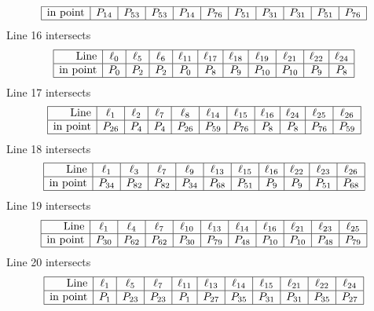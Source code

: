 \documentclass{article}
\begin{document}
{$$\begin{array}{|r*{10}{|c}|}
\hline
\mbox{in point}  & P_{14} & P_{53} & P_{53} & P_{14} & P_{76} & P_{51} & P_{31} & P_{31} & P_{51} & P_{76}\\
\hline
\end{array}
$$
Line 16 intersects 
$$
\begin{array}{|r*{10}{|c}|}
\hline
\mbox{Line}  & \ell_{0} & \ell_{5} & \ell_{6} & \ell_{11} & \ell_{17} & \ell_{18} & \ell_{19} & \ell_{21} & \ell_{22} & \ell_{24}\\
\hline
\mbox{in point}  & P_{0} & P_{2} & P_{2} & P_{0} & P_{8} & P_{9} & P_{10} & P_{10} & P_{9} & P_{8}\\
\hline
\end{array}
$$
Line 17 intersects 
$$
\begin{array}{|r*{10}{|c}|}
\hline
\mbox{Line}  & \ell_{1} & \ell_{2} & \ell_{7} & \ell_{8} & \ell_{14} & \ell_{15} & \ell_{16} & \ell_{24} & \ell_{25} & \ell_{26}\\
\hline
\mbox{in point}  & P_{26} & P_{4} & P_{4} & P_{26} & P_{59} & P_{76} & P_{8} & P_{8} & P_{76} & P_{59}\\
\hline
\end{array}
$$
Line 18 intersects 
$$
\begin{array}{|r*{10}{|c}|}
\hline
\mbox{Line}  & \ell_{1} & \ell_{3} & \ell_{7} & \ell_{9} & \ell_{13} & \ell_{15} & \ell_{16} & \ell_{22} & \ell_{23} & \ell_{26}\\
\hline
\mbox{in point}  & P_{34} & P_{82} & P_{82} & P_{34} & P_{68} & P_{51} & P_{9} & P_{9} & P_{51} & P_{68}\\
\hline
\end{array}
$$
Line 19 intersects 
$$
\begin{array}{|r*{10}{|c}|}
\hline
\mbox{Line}  & \ell_{1} & \ell_{4} & \ell_{7} & \ell_{10} & \ell_{13} & \ell_{14} & \ell_{16} & \ell_{21} & \ell_{23} & \ell_{25}\\
\hline
\mbox{in point}  & P_{30} & P_{62} & P_{62} & P_{30} & P_{79} & P_{48} & P_{10} & P_{10} & P_{48} & P_{79}\\
\hline
\end{array}
$$
Line 20 intersects 
$$
\begin{array}{|r*{10}{|c}|}
\hline
\mbox{Line}  & \ell_{1} & \ell_{5} & \ell_{7} & \ell_{11} & \ell_{13} & \ell_{14} & \ell_{15} & \ell_{21} & \ell_{22} & \ell_{24}\\
\hline
\mbox{in point}  & P_{1} & P_{23} & P_{23} & P_{1} & P_{27} & P_{35} & P_{31} & P_{31} & P_{35} & P_{27}\\
\hline
\end{array}
$$}
\end{document}
